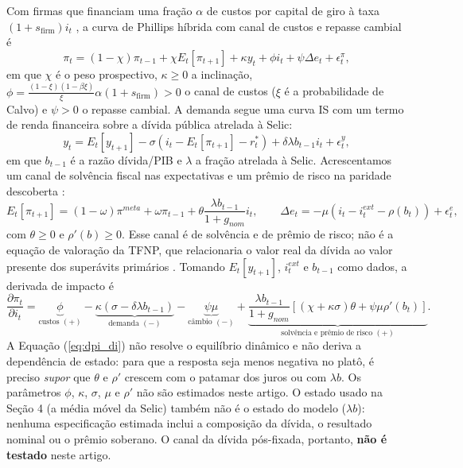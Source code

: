 \documentclass[12pt,a4paper]{article}
\begin{document}
Com firmas que financiam uma fração $\alpha$ de custos por capital de giro à taxa $(1+s_{\text{firm}})i_t$ \citep{barth2001cost, ravenna2006financial}, a curva de Phillips híbrida com canal de custos e repasse cambial é
\begin{equation}
\pi_t = (1 - \chi) \pi_{t-1} + \chi E_t [\pi_{t+1}] + \kappa y_t + \phi i_t + \psi \Delta e_t + \epsilon_t^\pi,
\label{eq:phillips}
\end{equation}
em que $\chi$ é o peso prospectivo, $\kappa \ge 0$ a inclinação, $\phi = \frac{(1-\xi)(1-\beta\xi)}{\xi}\alpha(1+s_{\text{firm}}) > 0$ o canal de custos ($\xi$ é a probabilidade de Calvo) e $\psi > 0$ o repasse cambial. A demanda segue uma curva IS com um termo de renda financeira sobre a dívida pública atrelada à Selic:
\begin{equation}
y_t = E_t[y_{t+1}] - \sigma \left( i_t - E_t[\pi_{t+1}] - r_t^* \right) + \delta \lambda b_{t-1} i_t + \epsilon_t^y,
\label{eq:is}
\end{equation}
em que $b_{t-1}$ é a razão dívida/PIB e $\lambda$ a fração atrelada à Selic. Acrescentamos um canal de solvência fiscal nas expectativas e um prêmio de risco na paridade descoberta \citep{blanchard2005fiscal}:
\begin{equation}
E_t[\pi_{t+1}] = (1 - \omega) \pi^{meta} + \omega \pi_{t-1} + \theta \frac{\lambda b_{t-1}}{1 + g_{nom}} i_t, \qquad
\Delta e_t = -\mu (i_t - i_t^{ext} - \rho(b_t)) + \epsilon_t^e,
\label{eq:expectations}
\end{equation}
com $\theta \ge 0$ e $\rho'(b) \ge 0$. Esse canal é de solvência e de prêmio de risco; não é a equação de valoração da TFNP, que relacionaria o valor real da dívida ao valor presente dos superávits primários \citep{cochrane2023fiscal}. Tomando $E_t[y_{t+1}]$, $i_t^{ext}$ e $b_{t-1}$ como dados, a derivada de impacto é
\begin{equation}
\frac{\partial\pi_t}{\partial i_t} = \underbrace{\phi}_{\text{custos }(+)} - \underbrace{\kappa (\sigma - \delta \lambda b_{t-1})}_{\text{demanda }(-)} - \underbrace{\psi \mu}_{\text{câmbio }(-)} + \underbrace{\frac{\lambda b_{t-1}}{1 + g_{nom}} \left[ (\chi + \kappa \sigma) \theta + \psi \mu \rho'(b_t) \right]}_{\text{solvência e prêmio de risco }(+)}.
\label{eq:dpi_di}
\end{equation}
A Equação (\ref{eq:dpi_di}) não resolve o equilíbrio dinâmico e não deriva a dependência de estado: para que a resposta seja menos negativa no platô, é preciso \emph{supor} que $\theta$ e $\rho'$ crescem com o patamar dos juros ou com $\lambda b$. Os parâmetros $\phi$, $\kappa$, $\sigma$, $\mu$ e $\rho'$ não são estimados neste artigo. O estado usado na Seção 4 (a média móvel da Selic) também não é o estado do modelo ($\lambda b$): nenhuma especificação estimada inclui a composição da dívida, o resultado nominal ou o prêmio soberano. O canal da dívida pós-fixada, portanto, \textbf{não é testado} neste artigo.
\end{document}
